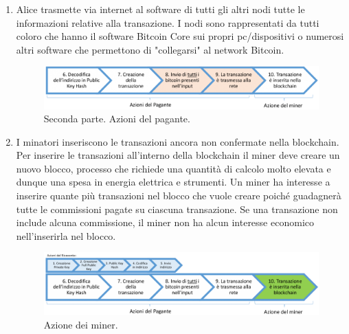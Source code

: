 \begin{enumerate}
\item Alice trasmette via internet al software di tutti gli altri nodi tutte le informazioni relative alla transazione. I nodi sono rappresentati da tutti coloro che hanno il software Bitcoin Core sui propri pc/dispositivi o numerosi altri software che permettono di "collegarsi" al network Bitcoin.
\begin{figure}[H]
	\centering
	\includegraphics[width=\textwidth]{images/passiAlice2.png}
	\caption{Seconda parte. Azioni del pagante.}
	\label{fig:aliceSteps2}
\end{figure}

\item I minatori inseriscono le transazioni ancora non confermate nella blockchain.
\\Per inserire le transazioni all’interno della blockchain il miner deve creare un nuovo blocco, processo che richiede una quantità di calcolo molto elevata e dunque una spesa in energia elettrica e strumenti. Un miner ha interesse a inserire quante più transazioni nel blocco che vuole creare poiché guadagnerà tutte le commissioni pagate su ciascuna transazione. Se una transazione non include alcuna commissione, il miner non ha alcun interesse economico nell’inserirla nel blocco.

\begin{figure}[H]
	\centering
	\includegraphics[width=\textwidth]{images/azioneMiner.png}
	\caption{Azione dei miner.}
	\label{fig:minerSteps}
\end{figure}


\end{enumerate}
